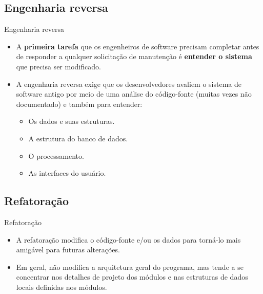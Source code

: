 \documentclass{beamer}
\begin{document}
\subsection{Engenharia reversa}

\begin{frame}{Engenharia reversa}
	\begin{itemize}
		\justifying
		\item A \textbf{primeira tarefa} que os engenheiros de software precisam completar antes de responder a qualquer solicitação de manutenção é \textbf{entender o sistema} que precisa ser modificado.
		\item A engenharia reversa exige que os desenvolvedores avaliem o sistema de software antigo por meio de uma análise do código-fonte (muitas vezes não documentado) e também para entender:
			\begin{itemize}
				\justifying
				\item Os dados e suas estruturas.
				\item A estrutura do banco de dados.
				\item O processamento.
				\item As interfaces do usuário.
			\end{itemize}
	\end{itemize}
\end{frame}

\subsection{Refatoração}

\begin{frame}{Refatoração}
	\begin{itemize}
		\justifying
		\item A refatoração modifica o código-fonte e/ou os dados para torná-lo mais amigável para futuras alterações.
		\item Em geral, não modifica a arquitetura geral do programa, mas tende a se concentrar nos detalhes de projeto dos módulos e nas estruturas de dados locais definidas nos módulos.
	\end{itemize}
\end{frame}
\end{document}
